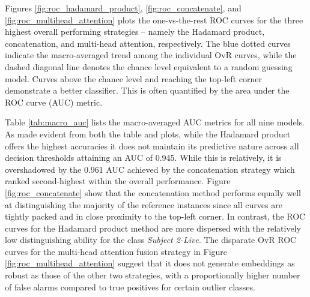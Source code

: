 \documentclass{mpaper}
\begin{document}
Figures \ref{fig:roc_hadamard_product}, \ref{fig:roc_concatenate}, and \ref{fig:roc_multihead_attention} plots the one-vs-the-rest ROC curves for the three highest overall performing strategies -- namely the Hadamard product, concatenation, and multi-head attention, respectively. The blue dotted curves indicate the macro-averaged trend among the individual OvR curves, while the dashed diagonal line denotes the chance level equivalent to a random guessing model. Curves above the chance level and reaching the top-left corner demonstrate a better classifier. This is often quantified by the area under the ROC curve (AUC) metric.

Table \ref{tab:macro_auc} lists the macro-averaged AUC metrics for all nine models. As made evident from both the table and plots, while the Hadamard product offers the highest accuracies it does not maintain its predictive nature across all decision thresholds attaining an AUC of 0.945. While this is relatively, it is overshadowed by the 0.961 AUC achieved by the concatenation strategy which ranked second-highest within the overall performance. Figure \ref{fig:roc_concatenate} show that the concatenation method performs equally well at distinguishing the majority of the reference instances since all curves are tightly packed and in close proximity to the top-left corner. In contrast, the ROC curves for the Hadamard product method are more dispersed with the relatively low distinguishing ability for the class \textit{Subject 2-Live}. The disparate OvR ROC curves for the multi-head attention fusion strategy in Figure \ref{fig:roc_multihead_attention} suggest that it does not generate embeddings as robust as those of the other two strategies, with a proportionally higher number of false alarms compared to true positives for certain outlier classes.
\end{document}
